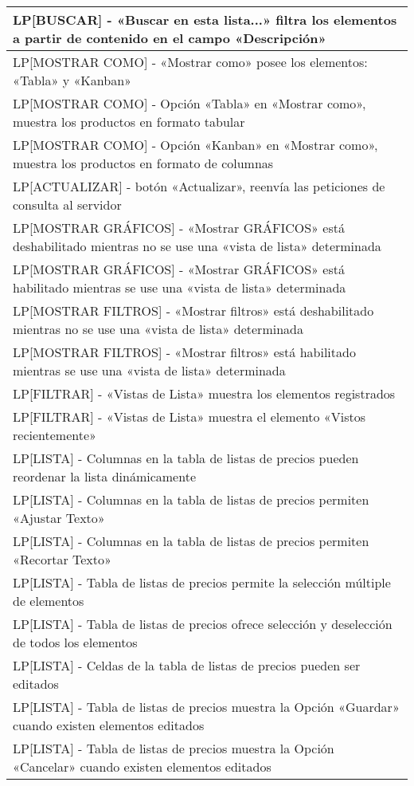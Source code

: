 \begin{longtable}{|p{15.0cm}|}
LP[BUSCAR] - «Buscar en esta lista...» filtra los elementos a partir de contenido en el campo «Descripción» \\ \hline
LP[MOSTRAR COMO] - «Mostrar como» posee los elementos: «Tabla» y «Kanban» \\ \hline
LP[MOSTRAR COMO] - Opción «Tabla» en «Mostrar como», muestra los productos en formato tabular \\ \hline
LP[MOSTRAR COMO] - Opción «Kanban» en «Mostrar como», muestra los productos en formato de columnas \\ \hline
LP[ACTUALIZAR] - botón «Actualizar», reenvía las peticiones de consulta al servidor \\ \hline
LP[MOSTRAR GRÁFICOS] - «Mostrar GRÁFICOS» está deshabilitado mientras no se use una «vista de lista» determinada \\ \hline
LP[MOSTRAR GRÁFICOS] - «Mostrar GRÁFICOS» está habilitado mientras se use una «vista de lista» determinada \\ \hline
LP[MOSTRAR FILTROS] - «Mostrar filtros» está deshabilitado mientras no se use una «vista de lista» determinada \\ \hline
LP[MOSTRAR FILTROS] - «Mostrar filtros» está habilitado mientras se use una «vista de lista» determinada \\ \hline
LP[FILTRAR] - «Vistas de Lista» muestra los elementos registrados \\ \hline
LP[FILTRAR] - «Vistas de Lista» muestra el elemento «Vistos recientemente» \\ \hline
LP[LISTA] - Columnas en la tabla de listas de precios pueden reordenar la lista dinámicamente \\ \hline
LP[LISTA] - Columnas en la tabla de listas de precios permiten «Ajustar Texto» \\ \hline
LP[LISTA] - Columnas en la tabla de listas de precios permiten «Recortar Texto» \\ \hline
LP[LISTA] - Tabla de listas de precios permite la selección múltiple de elementos \\ \hline
LP[LISTA] - Tabla de listas de precios ofrece selección y deselección de todos los elementos \\ \hline
LP[LISTA] - Celdas de la tabla de listas de precios pueden ser editados \\ \hline
LP[LISTA] - Tabla de listas de precios muestra la Opción «Guardar» cuando existen elementos editados \\ \hline
LP[LISTA] - Tabla de listas de precios muestra la Opción «Cancelar» cuando existen elementos editados \\ \hline

\end{longtable}
